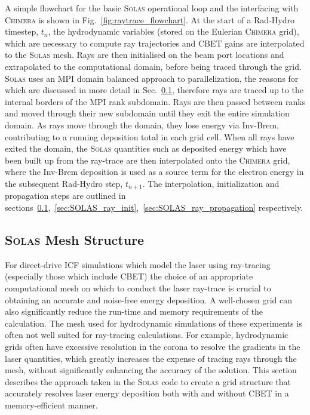 A simple flowchart for the basic \textsc{Solas} operational loop and the interfacing with \textsc{Chimera} is shown in Fig.~\ref{fig:raytrace_flowchart}.
At the start of a \ac{Rad-Hydro} timestep, $t_n$, the hydrodynamic variables (stored on the Eulerian \textsc{Chimera} grid), which are necessary to compute ray trajectories and \ac{CBET} gains are interpolated to the \textsc{Solas} mesh.
Rays are then initialised on the beam port locations and extrapolated to the computational domain, before being traced through the grid.
\textsc{Solas} uses an \ac{MPI} domain balanced approach to parallelization, the reasons for which are discussed in more detail in Sec.~\ref{sec:SOLAS_mesh}, therefore rays are traced up to the internal borders of the \ac{MPI} rank subdomain.
Rays are then passed between ranks and moved through their new subdomain until they exit the entire simulation domain.
As rays move through the domain, they lose energy via \ac{Inv-Brem}, contributing to a running deposition total in each grid cell.
When all rays have exited the domain, the \textsc{Solas} quantities such as deposited energy which have been built up from the ray-trace are then interpolated onto the \textsc{Chimera} grid, where the \ac{Inv-Brem} deposition is used as a source term for the electron energy in the subsequent \ac{Rad-Hydro} step, $t_{n+1}$.
The interpolation, initialization and propagation steps are outlined in sections~\ref{sec:SOLAS_mesh},~\ref{sec:SOLAS_ray_init},~\ref{sec:SOLAS_ray_propagation} respectively.


\subsection{\textsc{Solas} Mesh Structure}%
\label{sec:SOLAS_mesh}

For direct-drive \ac{ICF} simulations which model the laser using ray-tracing (especially those which include \ac{CBET}) the choice of an appropriate computational mesh on which to conduct the laser ray-trace is crucial to obtaining an accurate and noise-free energy deposition.
A well-chosen grid can also significantly reduce the run-time and memory requirements of the calculation.
The mesh used for hydrodynamic simulations of these experiments is often not well suited for ray-tracing calculations.
For example, hydrodynamic grids often have excessive resolution in the corona to resolve the gradients in the laser quantities, which greatly increases the expense of tracing rays through the mesh, without significantly enhancing the accuracy of the solution.
This section describes the approach taken in the \textsc{Solas} code to create a grid structure that accurately resolves laser energy deposition both with and without \ac{CBET} in a memory-efficient manner.

